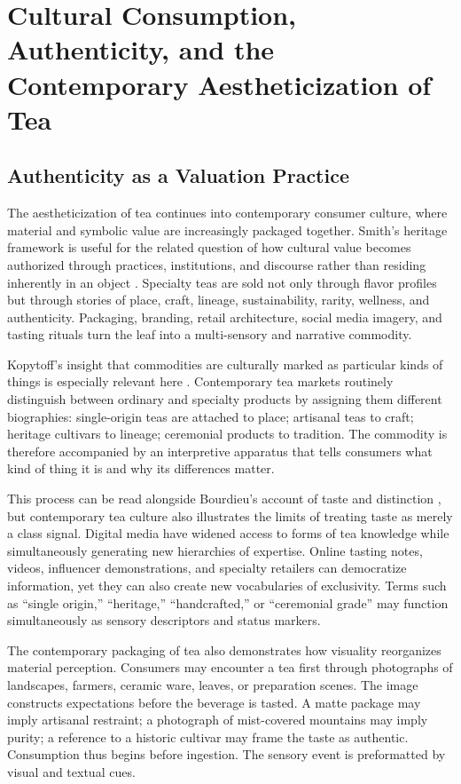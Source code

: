 \documentclass[numbers]{IntechOpen-Book}
\begin{document}
\section{Cultural Consumption, Authenticity, and the Contemporary Aestheticization of Tea}

\subsection{Authenticity as a Valuation Practice}

The aestheticization of tea continues into contemporary consumer culture, where material and symbolic value are increasingly packaged together. Smith's heritage framework is useful for the related question of how cultural value becomes authorized through practices, institutions, and discourse rather than residing inherently in an object \cite{smithheritage}. Specialty teas are sold not only through flavor profiles but through stories of place, craft, lineage, sustainability, rarity, wellness, and authenticity. Packaging, branding, retail architecture, social media imagery, and tasting rituals turn the leaf into a multi-sensory and narrative commodity.

Kopytoff's insight that commodities are culturally marked as particular kinds of things is especially relevant here \cite{kopytoff}. Contemporary tea markets routinely distinguish between ordinary and specialty products by assigning them different biographies: single-origin teas are attached to place; artisanal teas to craft; heritage cultivars to lineage; ceremonial products to tradition. The commodity is therefore accompanied by an interpretive apparatus that tells consumers what kind of thing it is and why its differences matter.

This process can be read alongside Bourdieu's account of taste and distinction \cite{bourdieu}, but contemporary tea culture also illustrates the limits of treating taste as merely a class signal. Digital media have widened access to forms of tea knowledge while simultaneously generating new hierarchies of expertise. Online tasting notes, videos, influencer demonstrations, and specialty retailers can democratize information, yet they can also create new vocabularies of exclusivity. Terms such as ``single origin,'' ``heritage,'' ``handcrafted,'' or ``ceremonial grade'' may function simultaneously as sensory descriptors and status markers.

The contemporary packaging of tea also demonstrates how visuality reorganizes material perception. Consumers may encounter a tea first through photographs of landscapes, farmers, ceramic ware, leaves, or preparation scenes. The image constructs expectations before the beverage is tasted. A matte package may imply artisanal restraint; a photograph of mist-covered mountains may imply purity; a reference to a historic cultivar may frame the taste as authentic. Consumption thus begins before ingestion. The sensory event is preformatted by visual and textual cues.
\end{document}
